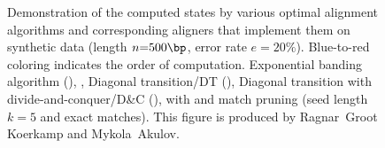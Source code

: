 \begin{figure}[H]
    \hspace{-8em}
    \hspace{2.5em}
    \caption[Behavior of various global alignment algorithms]{%
      Demonstration of the computed states by various optimal alignment
algorithms and corresponding aligners that implement them on synthetic data
(length $n{=}500\bp$, error rate $e{=}20\%$). Blue-to-red coloring indicates the
order of computation. \protect{} Exponential banding
algorithm (\edlib), \protect{} \dijkstra,
\protect{} Diagonal transition/DT (\oldwfa),
\protect{} Diagonal transition with
divide-and-conquer/D\&C (\wfa), \protect{} \A with \csh
and match pruning (seed length $k{=}5$ and exact matches). This figure is
produced by Ragnar~Groot Koerkamp and Mykola~Akulov.}
    \label{GLOBALfig:comparison}
\end{figure}
